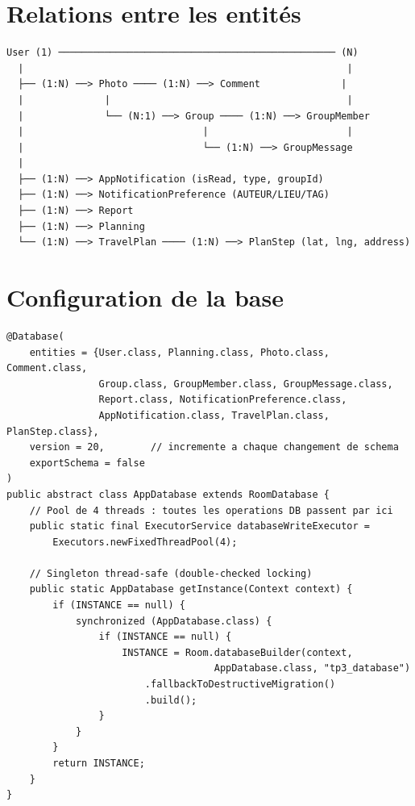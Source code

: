 \documentclass[a4paper,12pt,openany]{report}
\begin{document}
\section{Relations entre les entités}

\begin{tcolorbox}[mybox,colback=codebg,colframe=bord,
  left=8pt,right=8pt,top=8pt,bottom=8pt]
{\ttfamily\footnotesize\color{navy!80}
\begin{verbatim}
User (1) ──────────────────────────────────────────────── (N)
  |                                                        |
  ├── (1:N) ──> Photo ──── (1:N) ──> Comment              |
  |              |                                         |
  |              └── (N:1) ──> Group ──── (1:N) ──> GroupMember
  |                               |                        |
  |                               └── (1:N) ──> GroupMessage
  |
  ├── (1:N) ──> AppNotification (isRead, type, groupId)
  ├── (1:N) ──> NotificationPreference (AUTEUR/LIEU/TAG)
  ├── (1:N) ──> Report
  ├── (1:N) ──> Planning
  └── (1:N) ──> TravelPlan ──── (1:N) ──> PlanStep (lat, lng, address)
\end{verbatim}}
\end{tcolorbox}

\section{Configuration de la base}

\begin{lstlisting}
@Database(
    entities = {User.class, Planning.class, Photo.class, Comment.class,
                Group.class, GroupMember.class, GroupMessage.class,
                Report.class, NotificationPreference.class,
                AppNotification.class, TravelPlan.class, PlanStep.class},
    version = 20,        // incremente a chaque changement de schema
    exportSchema = false
)
public abstract class AppDatabase extends RoomDatabase {
    // Pool de 4 threads : toutes les operations DB passent par ici
    public static final ExecutorService databaseWriteExecutor =
        Executors.newFixedThreadPool(4);

    // Singleton thread-safe (double-checked locking)
    public static AppDatabase getInstance(Context context) {
        if (INSTANCE == null) {
            synchronized (AppDatabase.class) {
                if (INSTANCE == null) {
                    INSTANCE = Room.databaseBuilder(context,
                                    AppDatabase.class, "tp3_database")
                        .fallbackToDestructiveMigration()
                        .build();
                }
            }
        }
        return INSTANCE;
    }
}
\end{lstlisting}
\end{document}
